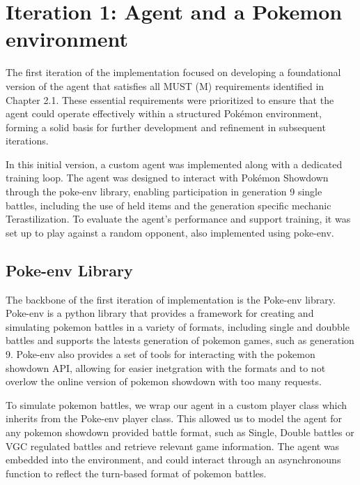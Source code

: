 \section{Iteration 1: Agent and a Pokemon environment} 
\label{sec:Iteration-1-Agent-Environment}

The first iteration of the implementation focused on developing a foundational version of the 
agent that satisfies all MUST (M) requirements identified in Chapter 2.1. These essential requirements 
were prioritized to ensure that the agent could operate effectively within a structured Pokémon environment, 
forming a solid basis for further development and refinement in subsequent iterations.

In this initial version, a custom agent was implemented along with a dedicated training loop. The agent was 
designed to interact with Pokémon Showdown through the poke-env library, enabling participation in generation 9 single battles, 
including the use of held items and the generation specific mechanic Terastilization. To evaluate the agent's 
performance and support training, it was set up to play against a random opponent, also implemented using poke-env. 



\subsection{Poke-env Library}
The backbone of the first iteration of implementation is the Poke-env library. 
Poke-env is a python library that provides a framework for creating and simulating pokemon
battles in a variety of formats, including single and doubble battles and supports the latests
generation of pokemon games, such as generation 9. Poke-env also provides a set of tools
for interacting with the pokemon showdown API, allowing for easier inetgration with the formats
and to not overlow the online version of pokemon showdown with too many requests.

To simulate pokemon battles, we wrap our agent in a custom player class which inherits from the
Poke-env player class. This allowed us to model the agent for any pokemon showdown 
provided battle format, such as Single, Double battles or VGC regulated battles and 
retrieve relevant game information. The agent was embedded into the environment, and could 
interact through an asynchronouns function to reflect the turn-based format of pokemon battles.



